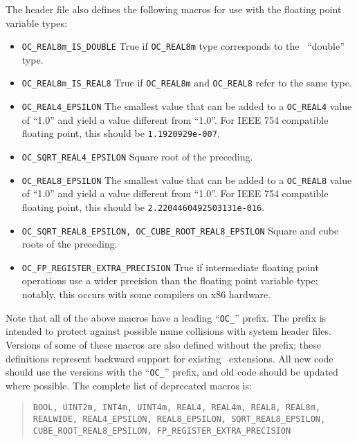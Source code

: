 The  header file also
defines the following macros for use with the floating point variable
types:
\begin{itemize}
\item{\texttt{OC\_REAL8m\_IS\_DOUBLE}} \gbs True if \texttt{OC\_REAL8m} type
  corresponds to the \Cplusplus\ ``double'' type.
\item{\texttt{OC\_REAL8m\_IS\_REAL8}} \gbs True if \texttt{OC\_REAL8m} and
  \texttt{OC\_REAL8} refer to the same type.
\item{\texttt{OC\_REAL4\_EPSILON}} \gbs The smallest value that can be added to
  a \texttt{OC\_REAL4} value of ``1.0'' and yield a value different from
  ``1.0''.  For IEEE 754 compatible floating point, this should be
  \texttt{1.1920929e-007}.
\item{\texttt{OC\_SQRT\_REAL4\_EPSILON}}
    \gbs Square root of the preceding.
\item{\texttt{OC\_REAL8\_EPSILON}} \gbs The smallest value that can be added to
  a \texttt{OC\_REAL8} value of ``1.0'' and yield a value different from
  ``1.0''.  For IEEE 754 compatible floating point, this should be
  \texttt{2.2204460492503131e-016}.
\item{\texttt{OC\_SQRT\_REAL8\_EPSILON, OC\_CUBE\_ROOT\_REAL8\_EPSILON}}
    \gbs Square and cube roots of the preceding.
\item{\texttt{OC\_FP\_REGISTER\_EXTRA\_PRECISION}} \gbs True if
  intermediate floating point operations use a wider precision than
  the floating point variable type; notably, this occurs with some
  compilers on x86 hardware.
\end{itemize}

Note that all of the above macros have a leading ``\texttt{OC\_}''
prefix.  The prefix is intended to protect against possible name
collisions with system header files.  Versions of some of these macros
are also defined without the prefix; these definitions represent
backward support for existing \OOMMF\ extensions.  All new code
should use the versions with the ``\texttt{OC\_}'' prefix, and old code
should be updated where possible.  The complete list of deprecated
macros is:
\begin{quote}
\raggedright
\texttt{BOOL, UINT2m, INT4m, UINT4m,
    REAL4, REAL4m, REAL8, REAL8m, REALWIDE,
    REAL4\_EPSILON, REAL8\_EPSILON,
    SQRT\_REAL8\_EPSILON, CUBE\_ROOT\_REAL8\_EPSILON,
    FP\_REGISTER\_EXTRA\_PRECISION
}
\end{quote}


